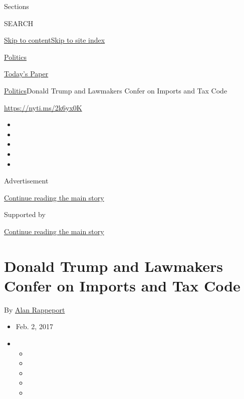 Sections

SEARCH

\protect\hyperlink{site-content}{Skip to
content}\protect\hyperlink{site-index}{Skip to site index}

\href{https://www.nytimes3xbfgragh.onion/section/politics}{Politics}

\href{https://myaccount.nytimes3xbfgragh.onion/auth/login?response_type=cookie\&client_id=vi}{}

\href{https://www.nytimes3xbfgragh.onion/section/todayspaper}{Today's
Paper}

\href{/section/politics}{Politics}\textbar{}Donald Trump and Lawmakers
Confer on Imports and Tax Code

\url{https://nyti.ms/2k6yx0K}

\begin{itemize}
\item
\item
\item
\item
\item
\end{itemize}

Advertisement

\protect\hyperlink{after-top}{Continue reading the main story}

Supported by

\protect\hyperlink{after-sponsor}{Continue reading the main story}

\hypertarget{donald-trump-and-lawmakers-confer-on-imports-and-tax-code}{%
\section{Donald Trump and Lawmakers Confer on Imports and Tax
Code}\label{donald-trump-and-lawmakers-confer-on-imports-and-tax-code}}

By \href{https://www.nytimes3xbfgragh.onion/by/alan-rappeport}{Alan
Rappeport}

\begin{itemize}
\item
  Feb. 2, 2017
\item
  \begin{itemize}
  \item
  \item
  \item
  \item
  \item
  \end{itemize}
\end{itemize}

